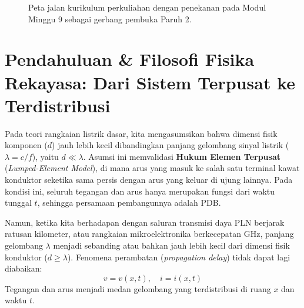 \documentclass[11pt,a4paper]{article}
\theoremstyle{definition}
\begin{document}
\begin{figure}[htbp]
{%
}
\caption{Peta jalan kurikulum perkuliahan dengan penekanan pada Modul Minggu 9 sebagai gerbang pembuka Paruh 2.}
\label{fig:peta_jalan_pd_w9}
\end{figure}

\section{Pendahuluan \& Filosofi Fisika Rekayasa: Dari Sistem Terpusat ke Terdistribusi}

Pada teori rangkaian listrik dasar, kita mengasumsikan bahwa dimensi fisik komponen ($d$) jauh lebih kecil dibandingkan panjang gelombang sinyal listrik ($\lambda = c/f$), yaitu $d \ll \lambda$. Asumsi ini memvalidasi \textbf{Hukum Elemen Terpusat} (\textit{Lumped-Element Model}), di mana arus yang masuk ke salah satu terminal kawat konduktor seketika sama persis dengan arus yang keluar di ujung lainnya. Pada kondisi ini, seluruh tegangan dan arus hanya merupakan fungsi dari waktu tunggal $t$, sehingga persamaan pembangunnya adalah PDB.

Namun, ketika kita berhadapan dengan saluran transmisi daya PLN berjarak ratusan kilometer, atau rangkaian mikroelektronika berkecepatan GHz, panjang gelombang $\lambda$ menjadi sebanding atau bahkan jauh lebih kecil dari dimensi fisik konduktor ($d \ge \lambda$). Fenomena perambatan (\textit{propagation delay}) tidak dapat lagi diabaikan:
\begin{equation}
    v = v(x, t), \quad i = i(x, t)
\end{equation}
Tegangan dan arus menjadi medan gelombang yang terdistribusi di ruang $x$ dan waktu $t$. 
\end{document}
